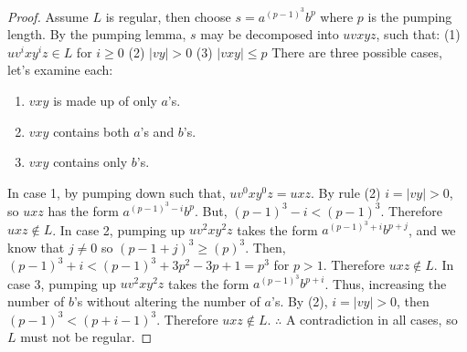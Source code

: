 \documentclass[11pt]{article}
\begin{document}
\begin{proof}
Assume $L$ is regular, then choose $s = a^{(p-1)^{3}}b^{p}$ where $p$ is the pumping length. By the pumping lemma, $s$ may be decomposed into $uvxyz$, such that:
\newline
\newline
(1) $uv^{i}xy^{i}z \in L$ for $i \geq 0$
\newline
(2) $|vy| > 0$
\newline
(3) $|vxy| \leq p$
\newline
\newline
There are three possible cases, let's examine each:
\begin{enumerate}
  \item $vxy$ is made up of only $a$'s.
  \item $vxy$ contains both $a$'s and $b$'s.
  \item $vxy$ contains only $b$'s.
\end{enumerate}
In case 1, by pumping down such that, $uv^{0}xy^{0}z = uxz$. By rule (2) $i = |vy| > 0$, so $uxz$ has the form $a^{(p-1)^{3}-i}b^{p}$. But, $(p-1)^{3}-i < (p-1)^{3}$. Therefore $uxz \notin L$.
\newline
\newline
In case 2, pumping up $uv^{2}xy^{2}z$ takes the form $a^{(p-1)^{3}+i}b^{p+j}$, and we know that $j \neq 0$ so $(p-1+j)^{3} \geq (p)^{3}$. Then, $(p-1)^{3} + i < (p-1)^{3} + 3p^{2} - 3p +1 = p^{3}$ for $p > 1$. Therefore $uxz \notin L$.
\newline
\newline
In case 3, pumping up $uv^{2}xy^{2}z$ takes the form $a^{(p-1)^{3}}b^{p+i}$. Thus, increasing the number of $b$'s without altering the number of $a$'s. By (2), $i = |vy| >0$, then $(p-1)^{3} < (p+i-1)^{3}$. Therefore $uxz \notin L$.
\newline
\newline
$\therefore$ A contradiction in all cases, so $L$ must not be regular.
\end{proof}
\end{document}
